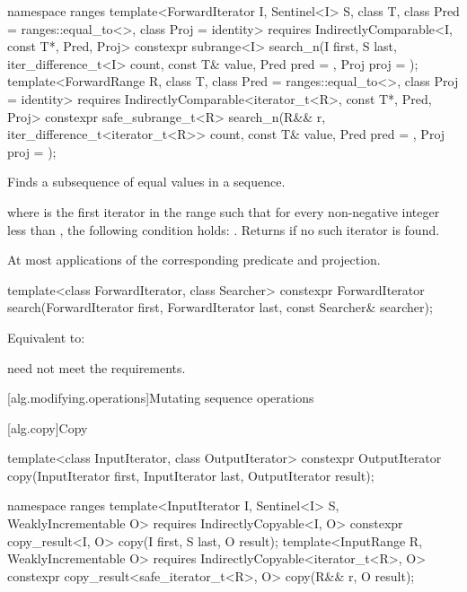 %
\begin{itemdecl}
namespace ranges {
  template<ForwardIterator I, Sentinel<I> S, class T,
      class Pred = ranges::equal_to<>, class Proj = identity>
    requires IndirectlyComparable<I, const T*, Pred, Proj>
    constexpr subrange<I>
      search_n(I first, S last, iter_difference_t<I> count,
               const T& value, Pred pred = {}, Proj proj = {});
  template<ForwardRange R, class T, class Pred = ranges::equal_to<>,
      class Proj = identity>
    requires IndirectlyComparable<iterator_t<R>, const T*, Pred, Proj>
    constexpr safe_subrange_t<R>
      search_n(R&& r, iter_difference_t<iterator_t<R>> count,
               const T& value, Pred pred = {}, Proj proj = {});
}
\end{itemdecl}

\begin{itemdescr}
\pnum
\effects
Finds a subsequence of equal values in a sequence.

\pnum
\returns
{} where  is the first iterator
in the range 
such that for every non-negative integer
less than
,
the following condition holds:
.
Returns 
if no such iterator is found.

\pnum
\complexity
At most
applications of the corresponding predicate and projection.
\end{itemdescr}

%
\begin{itemdecl}
template<class ForwardIterator, class Searcher>
  constexpr ForwardIterator
    search(ForwardIterator first, ForwardIterator last, const Searcher& searcher);
\end{itemdecl}

\begin{itemdescr}
\pnum
\effects
Equivalent to: 

\pnum
\remarks
{} need not meet the  requirements.
\end{itemdescr}


[alg.modifying.operations]{Mutating sequence operations}

[alg.copy]{Copy}

%
\begin{itemdecl}
template<class InputIterator, class OutputIterator>
  constexpr OutputIterator copy(InputIterator first, InputIterator last,
                                OutputIterator result);

namespace ranges {
  template<InputIterator I, Sentinel<I> S, WeaklyIncrementable O>
    requires IndirectlyCopyable<I, O>
    constexpr copy_result<I, O>
      copy(I first, S last, O result);
  template<InputRange R, WeaklyIncrementable O>
    requires IndirectlyCopyable<iterator_t<R>, O>
    constexpr copy_result<safe_iterator_t<R>, O>
      copy(R&& r, O result);
}
\end{itemdecl}

